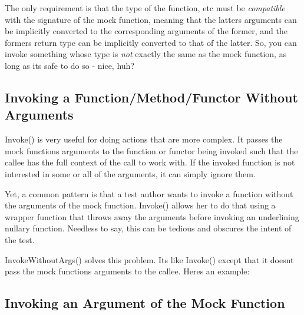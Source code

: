 The only requirement is that the type of the function, etc must be {\itshape compatible} with the signature of the mock function, meaning that the latter\textquotesingle{}s arguments can be implicitly converted to the corresponding arguments of the former, and the former\textquotesingle{}s return type can be implicitly converted to that of the latter. So, you can invoke something whose type is {\itshape not} exactly the same as the mock function, as long as it\textquotesingle{}s safe to do so -\/ nice, huh?

\subsection*{Invoking a Function/\+Method/\+Functor Without Arguments}

{\ttfamily Invoke()} is very useful for doing actions that are more complex. It passes the mock function\textquotesingle{}s arguments to the function or functor being invoked such that the callee has the full context of the call to work with. If the invoked function is not interested in some or all of the arguments, it can simply ignore them.

Yet, a common pattern is that a test author wants to invoke a function without the arguments of the mock function. {\ttfamily Invoke()} allows her to do that using a wrapper function that throws away the arguments before invoking an underlining nullary function. Needless to say, this can be tedious and obscures the intent of the test.

{\ttfamily Invoke\+Without\+Args()} solves this problem. It\textquotesingle{}s like {\ttfamily Invoke()} except that it doesn\textquotesingle{}t pass the mock function\textquotesingle{}s arguments to the callee. Here\textquotesingle{}s an example\+:


\begin{DoxyCode}{0}
\DoxyCodeLine{}
\DoxyCodeLine{\};}
\DoxyCodeLine{}
\DoxyCodeLine{}
\DoxyCodeLine{}
\end{DoxyCode}


\subsection*{Invoking an Argument of the Mock Function}

